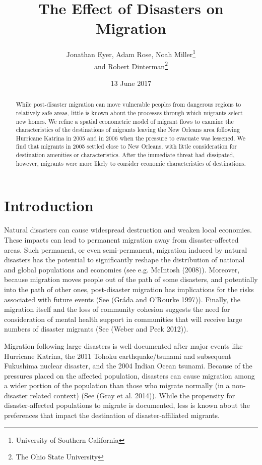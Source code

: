 \documentclass[]{article}
\title{The Effect of Disasters on Migration}
\author{Jonathan Eyer, Adam Rose, Noah Miller\footnote{University of Southern
  California} \\ and Robert Dinterman\footnote{The Ohio State University}}
\date{13 June 2017}
\begin{document}
\maketitle
\begin{abstract}
While post-disaster migration can move vulnerable peoples from dangerous
regions to relatively safe areas, little is known about the processes
through which migrants select new homes. We refine a spatial econometric
model of migrant flows to examine the characteristics of the
destinations of migrants leaving the New Orleans area following
Hurricane Katrina in 2005 and in 2006 when the pressure to evacuate was
lessened. We find that migrants in 2005 settled close to New Orleans,
with little consideration for destination amenities or characteristics.
After the immediate threat had dissipated, however, migrants were more
likely to consider economic characteristics of destinations.
\end{abstract}

\newpage

\section{Introduction}\label{introduction}

Natural disasters can cause widespread destruction and weaken local
economies. These impacts can lead to permanent migration away from
disaster-affected areas. Such permanent, or even semi-permanent,
migration induced by natural disasters has the potential to
significantly reshape the distribution of national and global
populations and economies (see e.g. McIntosh (2008)). Moreover, because
migration moves people out of the path of some disasters, and
potentially into the path of other ones, post-disaster migration has
implications for the risks associated with future events (See (Gráda and
O'Rourke 1997)). Finally, the migration itself and the loss of community
cohesion suggests the need for consideration of mental health support in
communities that will receive large numbers of disaster migrants (See
(Weber and Peek 2012)).

Migration following large disasters is well-documented after major
events like Hurricane Katrina, the 2011 Tohoku earthquake/tsunami and
subsequent Fukushima nuclear disaster, and the 2004 Indian Ocean
tsunami. Because of the pressures placed on the affected population,
disasters can cause migration among a wider portion of the population
than those who migrate normally (in a non-disaster related context) (See
(Gray et al. 2014)). While the propensity for disaster-affected
populations to migrate is documented, less is known about the
preferences that impact the destination of disaster-affiliated migrants.
\end{document}
